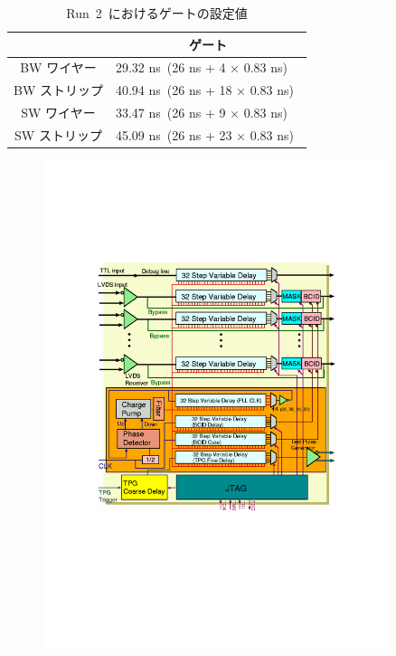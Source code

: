 \begin{table}[tbp]
	\centering
	\begin{tabular}{c|l}\hline
	& \multicolumn{1}{c}{ゲート} \\ \hline
	BW ワイヤー & 29.32 ns~(26 ns + 4 × 0.83 ns)~\\
	BW ストリップ & 40.94 ns~(26 ns + 18 × 0.83 ns)~\\
	SW ワイヤー & 33.47 ns~(26 ns + 9 × 0.83 ns)~\\
	SW ストリップ & 45.09 ns~(26 ns + 23 × 0.83 ns)~\\ \hline
	\end{tabular}
	\caption{Run~2~におけるゲートの設定値}
	\label{tb:BCIDGate}
\end{table}

\begin{figure}[tbp]
		\begin{minipage}{0.49\hsize}
		\centering
        \includegraphics[width=0.9\textwidth,page=3]{img/pdf/PP.pdf}
        \subcaption{}
        \end{minipage}

\end{figure}
